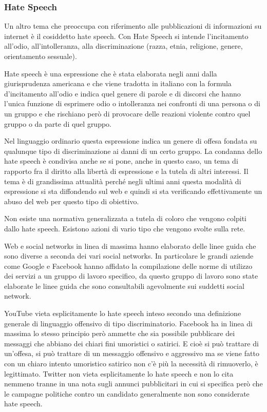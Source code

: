  \subsubsection{Hate Speech}
 Un altro tema che preoccupa con riferimento alle pubblicazioni di informazioni su internet è il cosiddetto hate speech. 
 Con Hate Speech si intende l'incitamento all'odio, all'intolleranza, alla discriminazione (razza, etnia, religione, genere, orientamento sessuale).\par
 Hate speech è una espressione che è stata elaborata negli anni dalla giurisprudenza americana e che viene tradotta in italiano con la formula d'incitamento all'odio e indica quel genere di parole e di discorsi che hanno l'unica funzione di esprimere odio o intolleranza nei confronti di una persona o di un gruppo e che rischiano però di provocare delle reazioni violente contro quel gruppo o da parte di quel gruppo.\par 
 Nel linguaggio ordinario questa espressione indica un genere di offesa fondata su qualunque tipo di discriminazione ai danni di un certo gruppo. La condanna dello hate speech è condivisa anche se si pone, anche in questo caso, un tema di rapporto fra il diritto alla libertà di espressione e la tutela di altri interessi. Il tema è di grandissima attualità perché negli ultimi anni questa modalità di espressione si sta diffondendo sul web e quindi si sta verificando effettivamente un abuso del web per questo tipo di obiettivo.\par
 Non esiste una normativa generalizzata a tutela di coloro che vengono colpiti dallo hate speech. Esistono azioni di vario tipo che vengono svolte sulla rete. \par
 Web e social networks in linea di massima hanno elaborato delle linee guida che sono diverse a seconda dei vari social networks. In particolare le grandi aziende come Google e Facebook hanno affidato la compilazione delle norme di utilizzo dei servizi a un gruppo di lavoro specifico, da questo gruppo di lavoro sono state elaborate le linee guida che sono consultabili agevolmente sui suddetti social network.\par
 YouTube vieta esplicitamente lo hate speech inteso secondo una definizione generale di linguaggio offensivo di tipo discriminatorio. Facebook ha in linea di massima lo stesso principio però ammette che sia possibile pubblicare dei messaggi che abbiano dei chiari fini umoristici o satirici. E cioè si può trattare di un'offesa, si può trattare di un messaggio offensivo e aggressivo ma se viene fatto con un chiaro intento umoristico satirico non c'è più la necessità di rimuoverlo, è legittimato. Twitter non vieta esplicitamente lo hate speech e non lo cita nemmeno tranne in una nota sugli annunci pubblicitari in cui si specifica però che le campagne politiche contro un candidato generalmente non sono considerate hate speech.\par

